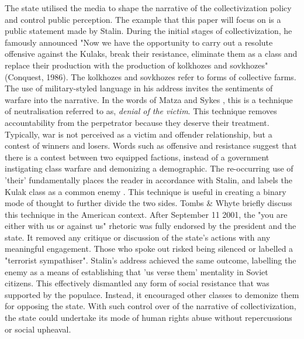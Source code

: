 \documentclass[12pt, a4paper,]{scrartcl}
\begin{document}
The state utilised the media to shape the narrative of the collectivization policy and control public perception. The example that this paper will focus on is a public statement made by Stalin. During the initial stages of collectivization, he famously announced "Now we have the opportunity to carry out a resolute offensive against the Kulaks, break their resistance, eliminate them as a class and replace their production with the production of kolkhozes and sovkhozes" (Conquest, 1986). The kolkhozes and sovkhozes refer to forms of collective farms. The use of military-styled language in his address invites the sentiments of warfare into the narrative. In the words of Matza and Sykes \citeyear{Matza1964}, this is a technique of neutralisation referred to as, \textit{denial of the victim}. This technique removes accountability from the perpetrator because they deserve their treatment. Typically, war is not perceived as a victim and offender relationship, but a contest of winners and losers. Words such as offensive and resistance suggest that there is a contest between two equipped factions, instead of a government instigating class warfare and demonizing a demographic. The re-occurring use of 'their' fundamentally places the reader in accordance with Stalin, and labels the Kulak class as a common enemy \cite{Neubacher2006}. This technique is useful in creating a binary mode of thought to further divide the two sides. Tombs \& Whyte \citeyear{STEVETOMBSandDAVEWHYTE2002} briefly discuss this technique in the American context. After September 11 2001, the "you are either with us or against us" rhetoric was fully endorsed by the president and the state. It removed any critique or discussion of the state's actions with any meaningful engagement. Those who spoke out risked being silenced or labelled a "terrorist sympathiser". Stalin's address achieved the same outcome, labelling the enemy as a means of establishing that 'us verse them' mentality in Soviet citizens. This effectively dismantled any form of social resistance that was supported by the populace. Instead, it encouraged other classes to demonize them for opposing the state. With such control over of the narrative of collectivization, the state could undertake its mode of human rights abuse without repercussions or social upheaval. \par
\end{document}
